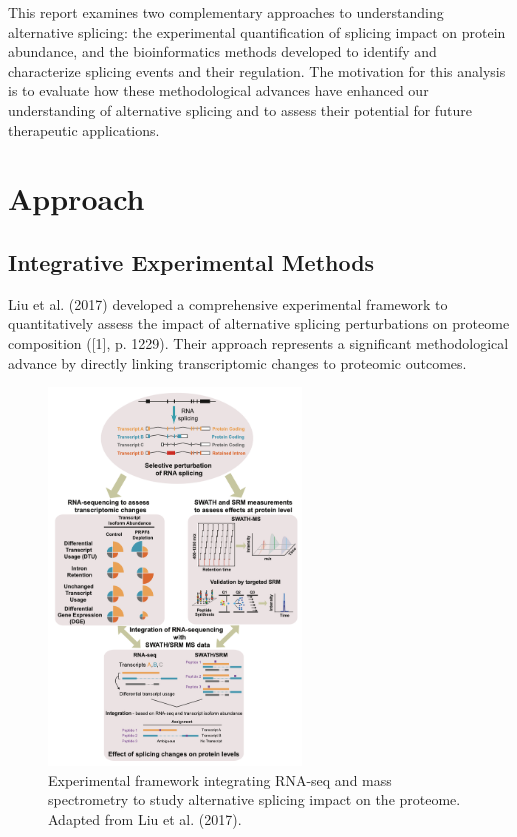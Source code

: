 \documentclass[12pt,a4paper]{article}
\begin{document}
This report examines two complementary approaches to understanding alternative splicing: the experimental quantification of splicing impact on protein abundance, and the bioinformatics methods developed to identify and characterize splicing events and their regulation. The motivation for this analysis is to evaluate how these methodological advances have enhanced our understanding of alternative splicing and to assess their potential for future therapeutic applications.

\section{Approach}

\subsection{Integrative Experimental Methods}

Liu et al. (2017) developed a comprehensive experimental framework to quantitatively assess the impact of alternative splicing perturbations on proteome composition ([1], p. 1229). Their approach represents a significant methodological advance by directly linking transcriptomic changes to proteomic outcomes.

\begin{figure}[H]
\centering
\includegraphics[width=0.6\textwidth]{framework_figure_1_liu.png}
\caption{Experimental framework integrating RNA-seq and mass spectrometry to study alternative splicing impact on the proteome. Adapted from Liu et al. (2017).}
\label{fig:experimental_framework}
\end{figure}
\end{document}

